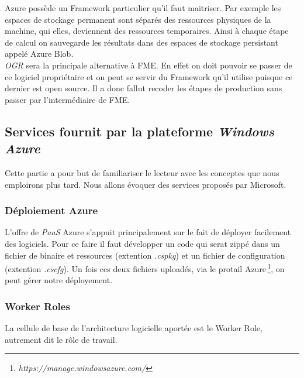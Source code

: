 Azure possède un Framework particulier qu'il faut maitriser. Par
exemple les espaces de stockage permanent sont séparés des ressources
physiques de la machine, qui elles, deviennent des ressources
temporaires. Ainsi à chaque étape de calcul on sauvegarde les
résultats dans des espaces de stockage persistant appelé Azure Blob.\\

 \textit{OGR} sera la principale alternative à FME. En effet on doit
 pouvoir se passer de ce logiciel propriétaire et on peut se servir du
 Framework qu'il utilise puisque ce dernier est open source. Il a donc
 fallut recoder les étapes de production sans passer par
 l'intermédiaire de FME.\\


%
%



\subsection{Services fournit par la plateforme \textit{Windows Azure}}
Cette partie a pour but de familiariser le lecteur avec les conceptes
que nous emploirons plus tard. Nous allons évoquer des services
proposés par Microsoft.\\


\subsubsection{Déploiement Azure}
L'offre de \textit{PaaS} Azure s'appuit principalement sur le fait de
déployer facilement des logiciels. Pour ce faire il faut développer un
code qui serat zippé dans un fichier de binaire et ressources
(extention \textit{.cspkg}) et un fichier de configuration (extention
\textit{.cscfg}). Un fois ces deux fichiers uploadés, via le protail
Azure\,\footnote{\textit{https://manage.windowsazure.com/}}, on peut
gérer notre déployement. \\

\subsubsection{Worker Roles}
La cellule de base de l'architecture logicielle aportée est le Worker
Role, autrement dit le rôle de travail. \\

